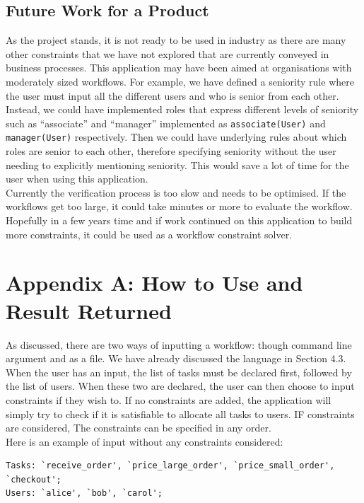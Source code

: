 \documentclass[a4paper]{report}
\begin{document}
\section{Future Work for a Product}
As the project stands, it is not ready to be used in industry as there are many other constraints that we have not explored that are currently conveyed in business processes. This application may have been aimed at organisations with moderately sized workflows. For example, we have defined a seniority rule where the user must input all the different users and who is senior from each other. Instead, we could have implemented roles that express different levels of seniority such as ``associate'' and ``manager'' implemented as \texttt{associate(User)} and \texttt{manager(User)} respectively. Then we could have underlying rules about which roles are senior to each other, therefore specifying seniority without the user needing to explicitly mentioning seniority. This would save a lot of time for the user when using this application.\\

Currently the verification process is too slow and needs to be optimised. If the workflows get too large, it could take minutes or more to evaluate the workflow. \\

Hopefully in a few years time and if work continued on this application to build more constraints, it could be used as a workflow constraint solver. \\

\chapter{Appendix A: How to Use and Result Returned}
As discussed, there are two ways of inputting a workflow: though command line argument and as a file. We have already discussed the language in Section 4.3.\\

When the user has an input, the list of tasks must be declared first, followed by the list of users. When these two are declared, the user can then choose to input constraints if they wish to. If no constraints are added, the application will simply try to check if it is satisfiable to allocate all tasks to users. IF constraints are considered, The constraints can be specified in any order.\\

Here is an example of input without any constraints considered:
\begin{lstlisting}[frame=single]
Tasks: `receive_order', `price_large_order', `price_small_order', `checkout';
Users: `alice', `bob', `carol';
\end{lstlisting}
\end{document}
